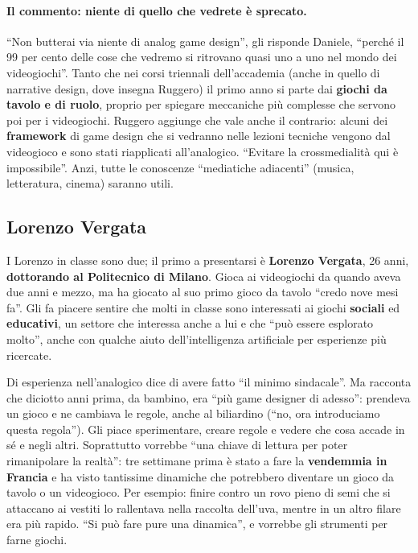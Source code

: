 \paragraph{Il commento: niente di quello che vedrete è sprecato.} ``Non butterai
via niente di analog game design'', gli risponde Daniele, ``perché il 99 per cento
delle cose che vedremo si ritrovano quasi uno a uno nel mondo dei videogiochi''.
Tanto che nei corsi triennali dell'accademia (anche in quello di narrative
design, dove insegna Ruggero) il primo anno si parte dai \textbf{giochi da tavolo
e di ruolo}, proprio per spiegare meccaniche più complesse che servono poi per i
videogiochi. Ruggero aggiunge che vale anche il contrario: alcuni dei
\textbf{framework} di game design che si vedranno nelle lezioni tecniche vengono
dal videogioco e sono stati riapplicati all'analogico. ``Evitare la
crossmedialità qui è impossibile''. Anzi, tutte le conoscenze ``mediatiche
adiacenti'' (musica, letteratura, cinema) saranno utili.

\subsection{Lorenzo Vergata}

I Lorenzo in classe sono due; il primo a presentarsi è \textbf{Lorenzo
Vergata}, 26 anni, \textbf{dottorando al Politecnico di Milano}. Gioca ai
videogiochi da quando aveva due anni e mezzo, ma ha giocato al suo primo gioco da
tavolo ``credo nove mesi fa''. Gli fa piacere sentire che molti in classe sono
interessati ai giochi \textbf{sociali} ed \textbf{educativi}, un settore che
interessa anche a lui e che ``può essere esplorato molto'', anche con qualche
aiuto dell'intelligenza artificiale per esperienze più ricercate.

Di esperienza nell'analogico dice di avere fatto ``il minimo sindacale''. Ma
racconta che diciotto anni prima, da bambino, era ``più game designer di
adesso'': prendeva un gioco e ne cambiava le regole, anche al biliardino (``no,
ora introduciamo questa regola''). Gli piace sperimentare, creare regole e
vedere che cosa accade in sé e negli altri. Soprattutto vorrebbe ``una chiave di
lettura per poter rimanipolare la realtà'': tre settimane prima è stato a fare la
\textbf{vendemmia in Francia} e ha visto tantissime dinamiche che potrebbero
diventare un gioco da tavolo o un videogioco. Per esempio: finire contro un rovo
pieno di semi che si attaccano ai vestiti lo rallentava nella raccolta
dell'uva, mentre in un altro filare era più rapido. ``Si può fare pure una
dinamica'', e vorrebbe gli strumenti per farne giochi.

